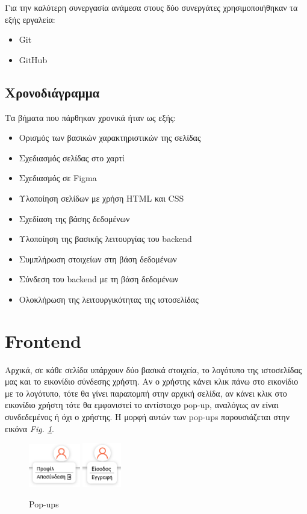 \documentclass[manuscript,screen,review, language=greek, language=english]{acmart}
\begin{document}
	Για την καλύτερη συνεργασία ανάμεσα στους δύο συνεργάτες χρησιμοποιήθηκαν τα εξής
	εργαλεία:

	\begin{itemize}
		\item Git \cite{Git}
		\item GitHub
	\end{itemize}

	\subsection{Χρονοδιάγραμμα}
	Τα βήματα που πάρθηκαν χρονικά ήταν ως εξής:

	\begin{itemize}
		\item Ορισμός των βασικών χαρακτηριστικών της σελίδας
		\item Σχεδιασμός σελίδας στο χαρτί
		\item Σχεδιασμός σε Figma
		\item Υλοποίηση σελίδων με χρήση HTML και CSS
		\item Σχεδίαση της βάσης δεδομένων
		\item Υλοποίηση της βασικής λειτουργίας του backend
		\item Συμπλήρωση στοιχείων στη βάση δεδομένων
		\item Σύνδεση του backend με τη βάση δεδομένων
		\item Ολοκλήρωση της λειτουργικότητας της ιστοσελίδας
	\end{itemize}


\section{Frontend}
	Αρχικά, σε κάθε σελίδα υπάρχουν δύο βασικά στοιχεία, το λογότυπο της ιστοσελίδας μας
	και το εικονίδιο σύνδεσης χρήστη. Αν ο χρήστης κάνει κλικ πάνω στο εικονίδιο με το
	λογότυπο, τότε θα γίνει παραπομπή στην αρχική σελίδα, αν κάνει κλικ στο εικονίδιο
	χρήστη τότε θα εμφανιστεί το αντίστοιχο pop-up, αναλόγως αν είναι συνδεδεμένος ή όχι
	ο χρήστης. Η μορφή αυτών των pop-ups παρουσιάζεται στην εικόνα
	\emph{Fig. \ref{fig:pop-ups}}.

	\begin{figure}[H]
		   \includegraphics[width=0.2\textwidth]{pop-up_1.png}
		   \includegraphics[width=0.15\textwidth]{pop-up_2.png}
		   \caption{Pop-ups}
		   \label{fig:pop-ups}
	\end{figure}
\end{document}
